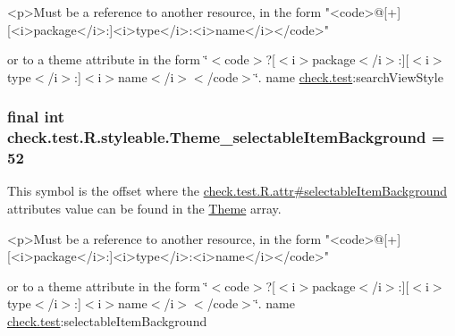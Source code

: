 \begin{DoxyVerb}      <p>Must be a reference to another resource, in the form "<code>@[+][<i>package</i>:]<i>type</i>:<i>name</i></code>"
\end{DoxyVerb}
 or to a theme attribute in the form \char`\"{}$<$code$>$?\mbox{[}$<$i$>$package$<$/i$>$\+:\mbox{]}\mbox{[}$<$i$>$type$<$/i$>$\+:\mbox{]}$<$i$>$name$<$/i$>$$<$/code$>$\char`\"{}.  name \hyperlink{namespacecheck_1_1test}{check.\+test}\+:search\+View\+Style \hypertarget{classcheck_1_1test_1_1_r_1_1styleable_a0316097f83d9af63e8806ec4839f94a9}{}
\subsubsection[{Theme\+\_\+selectable\+Item\+Background}]{\setlength{\rightskip}{0pt plus 5cm}final int check.\+test.\+R.\+styleable.\+Theme\+\_\+selectable\+Item\+Background = 52\hspace{0.3cm}{\ttfamily [static]}}\label{classcheck_1_1test_1_1_r_1_1styleable_a0316097f83d9af63e8806ec4839f94a9}
This symbol is the offset where the \hyperlink{classcheck_1_1test_1_1_r_1_1attr_afdec924c5188046ffd8cdee0a3aa3ca0}{check.\+test.\+R.\+attr\#selectable\+Item\+Background} attribute\textquotesingle{}s value can be found in the \hyperlink{classcheck_1_1test_1_1_r_1_1styleable_acca726d02016a0cf607782ec3a436a81}{Theme} array.

\begin{DoxyVerb}      <p>Must be a reference to another resource, in the form "<code>@[+][<i>package</i>:]<i>type</i>:<i>name</i></code>"
\end{DoxyVerb}
 or to a theme attribute in the form \char`\"{}$<$code$>$?\mbox{[}$<$i$>$package$<$/i$>$\+:\mbox{]}\mbox{[}$<$i$>$type$<$/i$>$\+:\mbox{]}$<$i$>$name$<$/i$>$$<$/code$>$\char`\"{}.  name \hyperlink{namespacecheck_1_1test}{check.\+test}\+:selectable\+Item\+Background \hypertarget{classcheck_1_1test_1_1_r_1_1styleable_ab577cbb82ea3ae0fddb617a7cbc27530}{}
